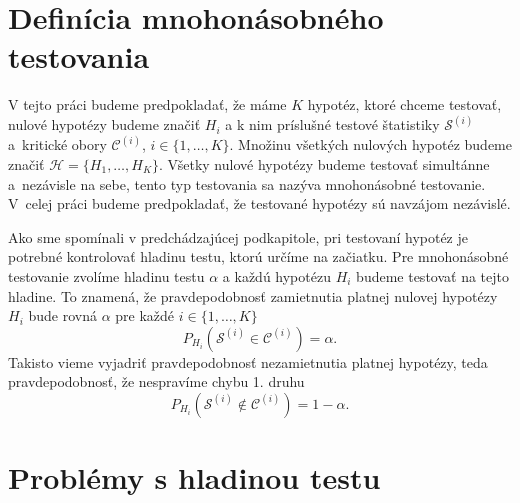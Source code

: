 \section{Definícia mnohonásobného testovania}

V tejto práci budeme predpokladať, že máme $K$ hypotéz, ktoré chceme testovať, 
nulové hypotézy budeme značiť $H_i$ a k nim príslušné
testové štatistiky $\mathcal{S}^{(i)}$ a~kritické obory $\mathcal{C}^{(i)}$, $i \in \{1, \dots, K\}$. 
Množinu všetkých nulových hypotéz budeme značiť ${\mathcal{H}} = \{ H_1, \dots, H_K \}$. 
Všetky nulové hypotézy budeme testovať simultánne a~nezávisle na sebe, 
tento typ testovania sa nazýva mnohonásobné testovanie. 
V~celej práci budeme predpokladať, že testované hypotézy sú navzájom nezávislé. 

Ako sme spomínali v predchádzajúcej podkapitole, pri testovaní hypotéz je potrebné kontrolovať hladinu testu, ktorú určíme na začiatku. 
Pre mnohonásobné testovanie zvolíme hladinu testu $\alpha$ a každú hypotézu $H_i$ budeme testovať na tejto hladine. 
To znamená, že pravdepodobnosť zamietnutia platnej nulovej hypotézy $H_i$ bude rovná $\alpha$ pre každé $i \in \{1, \dots, K\}$
$$ P_{H_i} \left( \mathcal{S}^{(i)} \in \mathcal{C}^{(i)} \right) = \alpha. $$
Takisto vieme vyjadriť pravdepodobnosť nezamietnutia platnej hypotézy, teda pravdepodobnosť, že nespravíme chybu 1. druhu 
$$ P_{H_i} \left( \mathcal{S}^{(i)} \notin \mathcal{C}^{(i)} \right) = 1 - \alpha. $$ 

\section{Problémy s hladinou testu}

